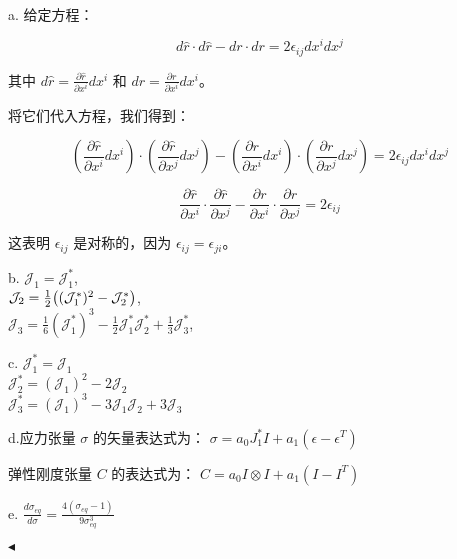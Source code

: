 \documentclass[11pt]{article}
\newenvironment{question}[2][Question]{\begin{trivlist}
\item[\hskip \labelsep {\bfseries #1}\hskip \labelsep {\bfseries #2.}]}{\hfill$\blacktriangleleft$\end{trivlist}}
\begin{document}
    \begin{question}{5 (10') (矩阵求导)}~
    
    a. 给定方程：
    
    \[ d\hat{r} \cdot d\hat{r} - dr \cdot dr = 2 \epsilon_{ij} dx^i dx^j \]
    
    其中 \( d\hat{r} = \frac{\partial \hat{r}}{\partial x^i} dx^i \) 和 \( dr = \frac{\partial r}{\partial x^i} dx^i \)。
    
    将它们代入方程，我们得到：
    
    \[ \left( \frac{\partial \hat{r}}{\partial x^i} dx^i \right) \cdot \left( \frac{\partial \hat{r}}{\partial x^j} dx^j \right) - \left( \frac{\partial r}{\partial x^i} dx^i \right) \cdot \left( \frac{\partial r}{\partial x^j} dx^j \right) = 2 \epsilon_{ij} dx^i dx^j \]
    
    \[ \frac{\partial \hat{r}}{\partial x^i} \cdot \frac{\partial \hat{r}}{\partial x^j} - \frac{\partial r}{\partial x^i} \cdot \frac{\partial r}{\partial x^j} = 2 \epsilon_{ij} \]
    
    这表明 \( \epsilon_{ij} \) 是对称的，因为 \( \epsilon_{ij} = \epsilon_{ji} \)。

    b.  \quad $\mathcal{J}_1 = \mathcal{J}_1^*$, \\
        $\mathcal{J}_2 = \frac{1}{2}\qty((\mathcal{J}_1^*)^2 - \mathcal{J}_2^*)$, \\
        $\mathcal{J}_3 = \frac{1}{6}(\mathcal{J}_1^*)^3 - \frac{1}{2} \mathcal{J}_1^* \mathcal{J}_2^* + \frac{1}{3}\mathcal{J}_3^*$,

    c.  $\mathcal{J}_1^* =  \mathcal{J}_1$\\
        $\mathcal{J}_2^* = (\mathcal{J}_1)^2 -2\mathcal{J}_2$\\
        $\mathcal{J}_3^* = (\mathcal{J}_1)^3 -3\mathcal{J}_1\mathcal{J}_2 + 3\mathcal{J}_3$

    d.应力张量 $\sigma$ 的矢量表达式为：
    $\sigma = a_0 J^*_{1} I + a_1 (\epsilon - \epsilon^T)$
    
    弹性刚度张量 \( C \) 的表达式为：
    $C = a_0 I \otimes I + a_1 (I - I^T)$
    
    e. 
    $\frac{d\sigma_{eq}}{d\sigma} = \frac{4(\sigma_{eq} - 1)}{9 \sigma_{eq}^3}$


    \end{question}
 
\end{document}
